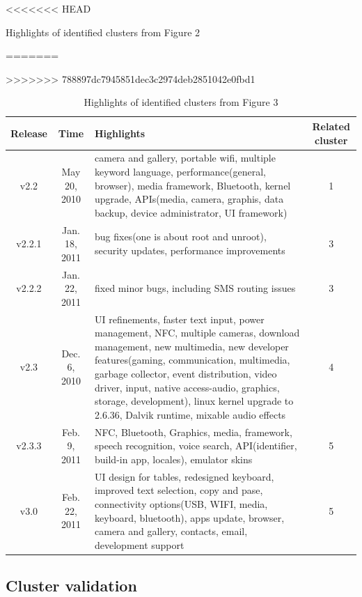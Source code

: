 \documentclass[conference]{IEEEtran}
\begin{document}
\begin{table}[!t]
<<<<<<< HEAD
\caption{Highlights of identified clusters from Figure 2}
=======
\caption{Highlights of identified clusters from Figure 3}
>>>>>>> 788897dc7945851dec3c2974deb2851042e0fbd1
\label{release}
\centering
\begin{tabular}{|c|c|p{9.5cm}|c|}
\hline
Release & Time & Highlights & Related cluster\\
\hline
v2.2 & May 20, 2010 & camera and gallery, portable wifi, multiple keyword language, performance(general, browser), media framework, Bluetooth, kernel upgrade, APIs(media, camera, graphis, data backup, device administrator, UI framework) & 1 \\
\hline
v2.2.1 & Jan. 18, 2011 & bug fixes(one is about root and unroot), security updates, performance improvements & 3\\
\hline
v2.2.2 & Jan. 22, 2011 & fixed minor bugs, including SMS routing issues & 3\\
\hline
v2.3 & Dec. 6, 2010 & UI refinements, faster text input, power management, NFC, multiple cameras, download management, new multimedia, new developer features(gaming, communication, multimedia, garbage collector, event distribution, video driver, input, native access-audio, graphics, storage, development), linux kernel upgrade to 2.6.36, Dalvik runtime, mixable audio effects & 4\\
\hline
v2.3.3 & Feb. 9, 2011 & NFC, Bluetooth, Graphics, media, framework, speech recognition, voice search, API(identifier, build-in app, locales), emulator skins & 5 \\
\hline
v3.0 & Feb. 22, 2011 & UI design for tables, redesigned keyboard, improved text selection, copy and pase, connectivity options(USB, WIFI, media, keyboard, bluetooth), apps update, browser, camera and gallery, contacts, email, development support & 5 \\
\hline
\end{tabular}
\end{table}



\subsection{Cluster validation}
\end{document}
